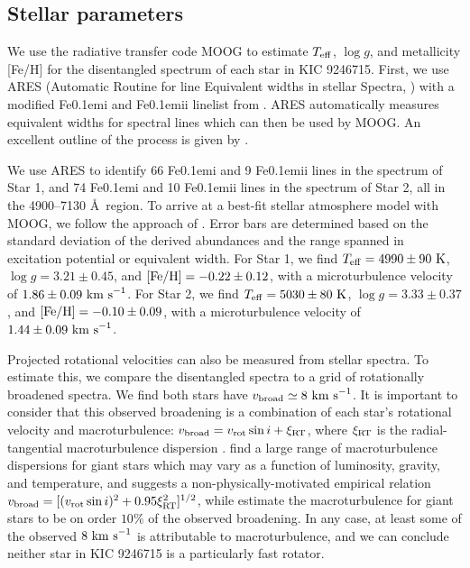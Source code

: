 \subsection{Stellar parameters}\label{parameters}
We use the radiative transfer code MOOG \citep{sne73} to estimate $T_{\rm{eff}}$, $\log g$, and metallicity [Fe/H] for the disentangled spectrum of each star in KIC 9246715. First, we use ARES (Automatic Routine for line Equivalent widths in stellar Spectra, \citealt{Sousa_2007}) with a modified {\rm Fe}\kern 0.1em{\sc i} and {\rm Fe}\kern 0.1em{\sc ii} linelist from \citet{tsa13}. ARES automatically measures equivalent widths for spectral lines which can then be used by MOOG. An excellent outline of the process is given by \citet{Sousa_2014}.

We use ARES to identify 66 {\rm Fe}\kern 0.1em{\sc i} and 9 {\rm Fe}\kern 0.1em{\sc ii} lines in the spectrum of Star 1, and 74 {\rm Fe}\kern 0.1em{\sc i} and 10 {\rm Fe}\kern 0.1em{\sc ii} lines in the spectrum of Star 2, all in the 4900--7130 \AA \ region. To arrive at a best-fit stellar atmosphere model with MOOG, we follow the approach of \citet{mag13}. Error bars are determined based on the standard deviation of the derived abundances and the range spanned in excitation potential or equivalent width. For Star 1, we find $T_{\rm{eff}} = 4990 \pm 90 \ \rm{K}$, $\log g = 3.21 \pm 0.45$, and $\rm{[Fe/H]} = -0.22 \pm 0.12$, with a microturbulence velocity of $1.86 \pm 0.09 \ \rm{km \ s}^{-1}$. For Star 2, we find $T_{\rm{eff}} = 5030 \pm 80 \ \rm{K}$, $\log g = 3.33 \pm 0.37$, and $\rm{[Fe/H]} = -0.10 \pm 0.09$, with a microturbulence velocity of $1.44 \pm 0.09 \ \rm{km \ s}^{-1}$.

Projected rotational velocities can also be measured from stellar spectra. To estimate this, we compare the disentangled spectra to a grid of rotationally broadened spectra. We find both stars have $v_{\rm{broad}} \simeq 8 \ \rm{km \ s}^{-1}$. It is important to consider that this observed broadening is a combination of each star's rotational velocity and macroturbulence: $v_{\rm{broad}} = v_{\rm{rot}} \sin i + \xi_{\rm{RT}}$, where $\xi_{\rm{RT}}$ is the radial-tangential macroturbulence dispersion \citep{gra78}. \citet{car08} find a large range of macroturbulence dispersions for giant stars which may vary as a function of luminosity, gravity, and temperature, and suggests a non-physically-motivated empirical relation $v_{\rm{broad}} = [(v_{\rm{rot}} \sin i)^2 + 0.95\xi_{\rm{RT}}^2]^{1/2}$, while \citet{tay15} estimate the macroturbulence for giant stars to be on order $10 \%$ of the observed broadening. In any case, at least some of the observed $8 \ \rm{km \ s}^{-1}$ is attributable to macroturbulence, and we can conclude neither star in KIC 9246715 is a particularly fast rotator.
